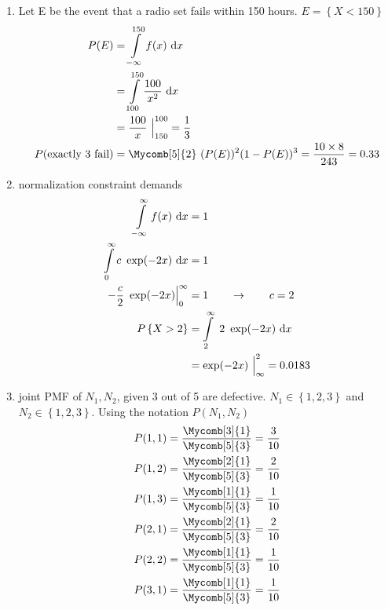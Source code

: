 \begin{enumerate}
	\item Let E be the event that a radio set fails within 150 hours. $ E = \left\{ X < 150 \right\} $ \\
	\begin{subequations}
		\begin{align}
			P(E) &= \int\limits_{-\infty}^{150} f(x) \ \mathrm{d}x \nonumber\\
			&= \int\limits_{100}^{150} \frac{100}{x^2} \ \mathrm{d}x \nonumber\\
			&= \frac{100}{x}\ \Big|_{150}^{100} = \frac{1}{3} \\
			P(\text{exactly 3 fail}) &= \Mycomb[5]{2} \ (P(E))^2 (1 - P(E))^3 = \frac{10 \times 8}{243} = 0.33
		\end{align}\\
	\end{subequations}
	
	\item normalization constraint demands \\
	\begin{subequations}
		\begin{align}
			\int\limits_{-\infty}^{\infty} f(x)\ \mathrm{d}x &= 1 \nonumber \\
			\int\limits_{0}^{\infty} c \ \exp(-2x)\ \mathrm{d}x &= 1 \nonumber\\
			-\frac{c}{2} \ \exp(-2x) \Big|_0^\infty &= 1 \qquad \to \qquad c = 2 \\
			P \left\{X > 2 \right\} &= \int\limits_{2}^{\infty}\ 2\ \exp(-2x)\ \mathrm{d}x \nonumber \\
			&= \exp(-2x)\ \Big|_{\infty}^{2} = 0.0183
		\end{align}\\
	\end{subequations}
	
	\item joint PMF of $ N_1, N_2 $, given 3 out of 5 are defective. $ N_1 \in \left\{1, 2, 3\right\} $ and $ N_2 \in \left\{ 1, 2, 3 \right\} $. Using the notation $ P(N_1, N_2) $\\
	
	\begin{align}
		P(1, 1) = \frac{\Mycomb[3]{1}}{\Mycomb[5]{3}} = \frac{3}{10} \nonumber \\
		P(1, 2) = \frac{\Mycomb[2]{1}}{\Mycomb[5]{3}} = \frac{2}{10} \nonumber \\
		P(1, 3) = \frac{\Mycomb[1]{1}}{\Mycomb[5]{3}} = \frac{1}{10} \nonumber \\
		P(2, 1) = \frac{\Mycomb[2]{1}}{\Mycomb[5]{3}} = \frac{2}{10} \nonumber \\
		P(2, 2) = \frac{\Mycomb[1]{1}}{\Mycomb[5]{3}} = \frac{1}{10} \nonumber \\
		P(3, 1) = \frac{\Mycomb[1]{1}}{\Mycomb[5]{3}} = \frac{1}{10} \nonumber \\
	\end{align} \\
	

\end{enumerate}
